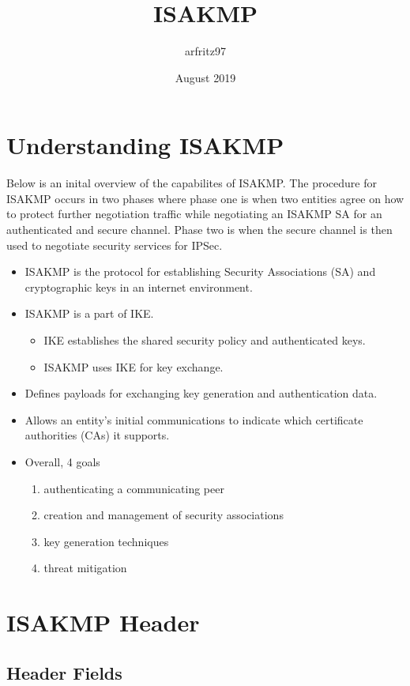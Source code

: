 \documentclass{article}
\title{ISAKMP}
\author{arfritz97 }
\date{August 2019}
\begin{document}
\maketitle

\section {Understanding ISAKMP}

Below is an inital overview of the capabilites of ISAKMP. The procedure for ISAKMP occurs in two phases where phase one is when two entities agree on how to protect further negotiation traffic while negotiating an ISAKMP SA for an authenticated and secure channel. Phase two is when the secure channel is then used to negotiate security services for IPSec.

\begin{itemize}
\item ISAKMP is the protocol for establishing Security Associations (SA) and cryptographic keys in an internet environment.
\item ISAKMP is a part of IKE.
	\begin{itemize}
	\item IKE establishes the shared security policy and authenticated keys.
	\item ISAKMP uses IKE for key exchange.
	\end{itemize}
\item Defines payloads for exchanging key generation and authentication data.
\item Allows an entity's initial communications to indicate which certificate authorities (CAs) it supports.
\item Overall, 4 goals
	\begin{enumerate}
	\item authenticating a communicating peer
	\item creation and management of security associations
	\item key generation techniques
	\item threat mitigation
	\end{enumerate}
\end{itemize}

\section {ISAKMP Header}

\subsection {Header Fields}
\end{document}
